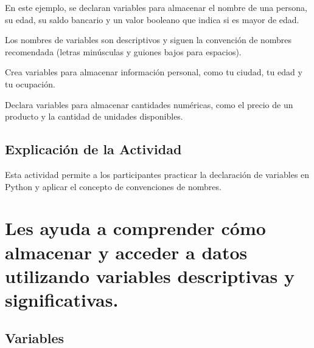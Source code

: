 \documentclass[
  a4paper,
  onepage,
  openany]{scrreprt}
\begin{document}
En este ejemplo, se declaran variables para almacenar el nombre de una
persona, su edad, su saldo bancario y un valor booleano que indica si es
mayor de edad.

Los nombres de variables son descriptivos y siguen la convención de
nombres recomendada (letras minúsculas y guiones bajos para espacios).

\begin{tcolorbox}[enhanced jigsaw, breakable, opacityback=0, toptitle=1mm, coltitle=black, toprule=.15mm, rightrule=.15mm, colframe=quarto-callout-important-color-frame, opacitybacktitle=0.6, arc=.35mm, title=\textcolor{quarto-callout-important-color}{\faExclamation}\hspace{0.5em}{Actividad Práctica}, titlerule=0mm, colbacktitle=quarto-callout-important-color!10!white, bottomtitle=1mm, bottomrule=.15mm, colback=white, left=2mm, leftrule=.75mm]

Crea variables para almacenar información personal, como tu ciudad, tu
edad y tu ocupación.

Declara variables para almacenar cantidades numéricas, como el precio de
un producto y la cantidad de unidades disponibles.

\end{tcolorbox}

\hypertarget{explicaciuxf3n-de-la-actividad-8}{%
\section{Explicación de la
Actividad}\label{explicaciuxf3n-de-la-actividad-8}}

Esta actividad permite a los participantes practicar la declaración de
variables en Python y aplicar el concepto de convenciones de nombres.

\hypertarget{les-ayuda-a-comprender-cuxf3mo-almacenar-y-acceder-a-datos-utilizando-variables-descriptivas-y-significativas.}{%
\chapter{Les ayuda a comprender cómo almacenar y acceder a datos
utilizando variables descriptivas y
significativas.}\label{les-ayuda-a-comprender-cuxf3mo-almacenar-y-acceder-a-datos-utilizando-variables-descriptivas-y-significativas.}}

\hypertarget{variables-4}{%
\section{Variables}\label{variables-4}}
\end{document}
